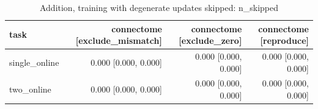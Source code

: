 \begin{table}[t]
\centering
\small
\begin{tabular}{lrrr}
\toprule
task & connectome [exclude\_mismatch] & connectome [exclude\_zero] & connectome [reproduce] \\
\midrule
single\_online & 0.000 [0.000, 0.000] & 0.000 [0.000, 0.000] & 0.000 [0.000, 0.000] \\
two\_online & 0.000 [0.000, 0.000] & 0.000 [0.000, 0.000] & 0.000 [0.000, 0.000] \\
\bottomrule
\end{tabular}
\caption{Addition, training with degenerate updates skipped: n\_skipped}
\label{tab:kc_diag_n_skipped}
\end{table}